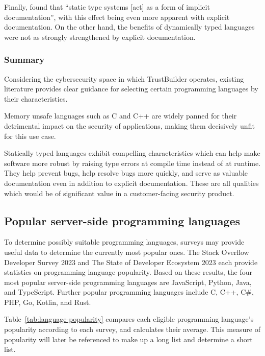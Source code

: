 Finally, \textcite{Endrikat2014} found that ``static type systems [act] as a form of implicit documentation'', with this effect being even more apparent with explicit documentation. On the other hand, the benefits of dynamically typed languages were not as strongly strengthened by explicit documentation. 


\subsubsection{Summary}
Considering the cybersecurity space in which TrustBuilder operates, existing literature provides clear guidance for selecting certain programming languages by their characteristics. 

Memory unsafe languages such as C and C++ are widely panned for their detrimental impact on the security of applications, making them decisively unfit for this use case. 

Statically typed languages exhibit compelling characteristics which can help make software more robust by raising type errors at compile time instead of at runtime. They help prevent bugs, help resolve bugs more quickly, and serve as valuable documentation even in addition to explicit documentation. These are all qualities which would be of significant value in a customer-facing security product.

\subsection{Popular server-side programming languages}
To determine possibly suitable programming languages, surveys may provide useful data to determine the currently most popular ones. The Stack Overflow Developer Survey 2023 \autocite{StackOverflow2023} and The State of Developer Ecosystem 2023 \autocite{JetBrains2023} each provide statistics on programming language popularity. Based on these results, the four most popular server-side programming languages are JavaScript, Python, Java, and TypeScript. Further popular programming languages include C, C++, C\#, PHP, Go, Kotlin, and Rust.

Table~\ref{tab:language-popularity} compares each eligible programming language's popularity according to each survey, and calculates their average. This measure of popularity will later be referenced to make up a long list and determine a short list.

